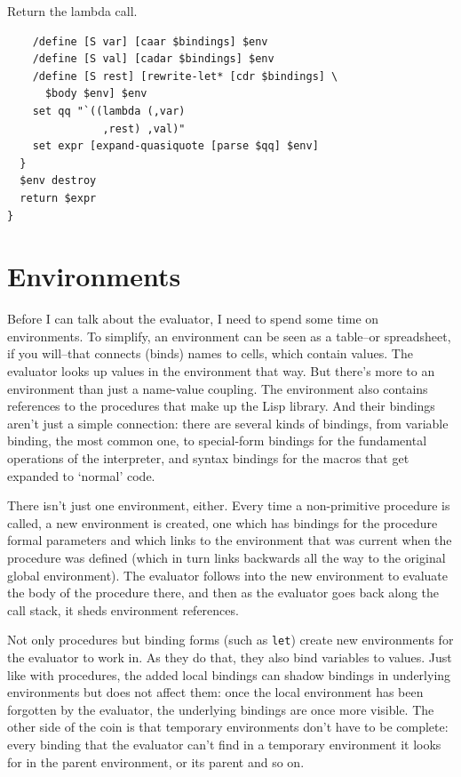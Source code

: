 \documentclass[a5paper,draft]{memoir}
\begin{document}
Return the lambda call.

\begin{lstlisting}
    /define [S var] [caar $bindings] $env
    /define [S val] [cadar $bindings] $env
    /define [S rest] [rewrite-let* [cdr $bindings] \
      $body $env] $env
    set qq "`((lambda (,var)
               ,rest) ,val)"
    set expr [expand-quasiquote [parse $qq] $env]
  }
  $env destroy
  return $expr
}
\end{lstlisting}

\section{Environments}
\label{environments}

Before I can talk about the evaluator, I need to spend some time on environments. To simplify, an environment can be seen as a table--or spreadsheet, if you will--that connects (binds) names to cells, which contain values. The evaluator looks up values in the environment that way. But there's more to an environment than just a name-value coupling. The environment also contains references to the procedures that make up the Lisp library. And their bindings aren't just a simple connection: there are several kinds of bindings, from variable binding, the most common one, to special-form bindings for the fundamental operations of the interpreter, and syntax bindings for the macros that get expanded to `normal' code.

There isn't just one environment, either. Every time a non-primitive procedure is called, a new environment is created, one which has bindings for the procedure formal parameters and which links to the environment that was current when the procedure was defined (which in turn links backwards all the way to the original global environment). The evaluator follows into the new environment to evaluate the body of the procedure there, and then as the evaluator goes back along the call stack, it sheds environment references.

Not only procedures but binding forms (such as \texttt{let}) create new environments for the evaluator to work in. As they do that, they also bind variables to values. Just like with procedures, the added local bindings can shadow bindings in underlying environments but does not affect them: once the local environment has been forgotten by the evaluator, the underlying bindings are once more visible. The other side of the coin is that temporary environments don't have to be complete: every binding that the evaluator can't find in a temporary environment it looks for in the parent environment, or its parent and so on.
\end{document}
